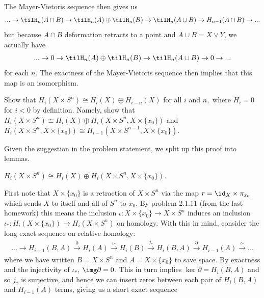 \begin{homework}[e]
\begin{prf}
    The Mayer-Vietoris sequence then gives us
    \begin{align*}
      ... \to \tilH_n(A\cap B) \to \tilH_n(A)\oplus \tilH_n(B) \to \tilH_n(A\cup B) \to H_{n-1}(A\cap B)\to ...
    \end{align*}
    but because $A\cap B$ deformation retracts to a point and $A\cup B = X\vee Y$, we actually have
    \begin{align*}
      ... \to 0 \to \tilH_n(A)\oplus \tilH_n(B) \to \tilH_n(A\cup B)\to 0 \to ...
    \end{align*}
    for each $n$. The exactness of the Mayer-Vietoris sequence then implies that this map is an isomorphism.
  \end{prf}
   Show that $H_i(X\times S^n)\cong H_i(X)\oplus H_{i-n}(X)$ for all $i$ and $n,$ where $H_i = 0$ for $i < 0$ by definition. Namely, show that $H_i(X\times S^n)\cong H_i(X) \oplus H_i(X\times S^n, X\times \{x_0\})$ and $H_i(X\times S^n, X\times \{x_0\}) \cong H_{i-1}(X\times S^{n-1},X\times \{x_0\})$.
  \begin{prf}
    Given the suggestion in the problem statement, we split up this proof into lemmas.
    \begin{lem}\label{lem:problem2.2.36a}
      $H_i(X\times S^n)\cong H_i(X) \oplus H_i(X\times S^n,X\times \{x_0\})$.
    \end{lem}
    \begin{prf}
      First note that $X\times \{x_0\}$ is a retraction of $X\times S^n$ via the map $r = \id_X\times \pi_{x_0}$ which sends $X$ to itself and all of $S^n$ to $x_0$. By problem 2.1.11 (from the last homework) this means the inclusion $\iota:X\times \{x_0\}\to X\times S^n$ induces an inclusion $\iota_*:H_i(X\times \{x_0\}) \to H_i(X\times S^n)$ on homology. With this in mind, consider the long exact sequence on relative homology:
      \begin{align*}
        ...\to H_{i+1}(B,A) \xrightarrow{\partial} H_i(A) \xrightarrow{\iota_*} H_i(B) \xrightarrow{j_*} H_i(B,A) \xrightarrow{\partial} H_{i-1}(A) \xrightarrow{\iota_*} ...
      \end{align*}
      where we have written $B = X\times S^n$ and $A = X\times \{x_0\}$ to save space. By exactness and the injectivity of $\iota_*$, $\img \partial = 0$. This in turn implies $\ker\partial = H_i(B,A)$ and so $j_*$ is surjective, and hence we can insert zeros between each pair of $H_i(B,A)$ and $H_{i-1}(A)$ terms, giving us a short exact sequence
      \begin{align*}

\end{align*}
\end{prf}
\end{prf}
\end{homework}
